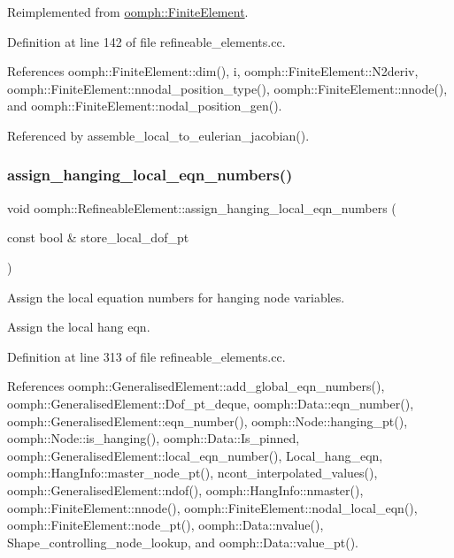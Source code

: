Reimplemented from \hyperlink{classoomph_1_1FiniteElement_aa62df89ea3850a5d46fb87bdc9d35c59}{oomph\+::\+Finite\+Element}.



Definition at line 142 of file refineable\+\_\+elements.\+cc.



References oomph\+::\+Finite\+Element\+::dim(), i, oomph\+::\+Finite\+Element\+::\+N2deriv, oomph\+::\+Finite\+Element\+::nnodal\+\_\+position\+\_\+type(), oomph\+::\+Finite\+Element\+::nnode(), and oomph\+::\+Finite\+Element\+::nodal\+\_\+position\+\_\+gen().



Referenced by assemble\+\_\+local\+\_\+to\+\_\+eulerian\+\_\+jacobian().

\mbox{\label{classoomph_1_1RefineableElement_a381592dd61261f9d5e0b2f88f799c3fc}} 
\subsubsection{\texorpdfstring{assign\+\_\+hanging\+\_\+local\+\_\+eqn\+\_\+numbers()}{assign\_hanging\_local\_eqn\_numbers()}}
{\footnotesize\ttfamily void oomph\+::\+Refineable\+Element\+::assign\+\_\+hanging\+\_\+local\+\_\+eqn\+\_\+numbers (\begin{DoxyParamCaption}\item[{const bool \&}]{store\+\_\+local\+\_\+dof\+\_\+pt }\end{DoxyParamCaption})\hspace{0.3cm}{\ttfamily [protected]}}



Assign the local equation numbers for hanging node variables. 

Assign the local hang eqn. 

Definition at line 313 of file refineable\+\_\+elements.\+cc.



References oomph\+::\+Generalised\+Element\+::add\+\_\+global\+\_\+eqn\+\_\+numbers(), oomph\+::\+Generalised\+Element\+::\+Dof\+\_\+pt\+\_\+deque, oomph\+::\+Data\+::eqn\+\_\+number(), oomph\+::\+Generalised\+Element\+::eqn\+\_\+number(), oomph\+::\+Node\+::hanging\+\_\+pt(), oomph\+::\+Node\+::is\+\_\+hanging(), oomph\+::\+Data\+::\+Is\+\_\+pinned, oomph\+::\+Generalised\+Element\+::local\+\_\+eqn\+\_\+number(), Local\+\_\+hang\+\_\+eqn, oomph\+::\+Hang\+Info\+::master\+\_\+node\+\_\+pt(), ncont\+\_\+interpolated\+\_\+values(), oomph\+::\+Generalised\+Element\+::ndof(), oomph\+::\+Hang\+Info\+::nmaster(), oomph\+::\+Finite\+Element\+::nnode(), oomph\+::\+Finite\+Element\+::nodal\+\_\+local\+\_\+eqn(), oomph\+::\+Finite\+Element\+::node\+\_\+pt(), oomph\+::\+Data\+::nvalue(), Shape\+\_\+controlling\+\_\+node\+\_\+lookup, and oomph\+::\+Data\+::value\+\_\+pt().



